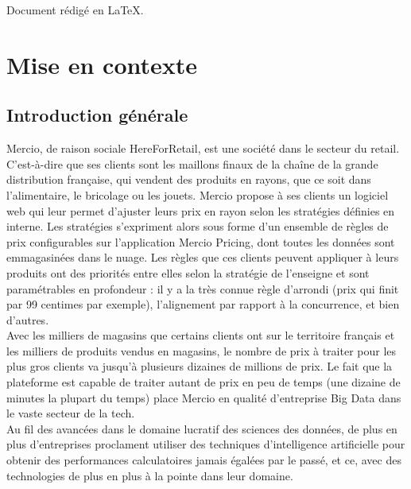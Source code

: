 \documentclass{rapportCS}
\begin{document}
Document rédigé en \LaTeX.
\newpage


\tabledematieres %




\section{Mise en contexte} 

\subsection{Introduction générale}
Mercio, de raison sociale HereForRetail, est une société dans le secteur du retail. 
C'est-à-dire que ses clients sont les maillons finaux de la chaîne de la grande distribution 
française, qui vendent des produits en rayons, que ce soit dans l'alimentaire, le bricolage 
ou les jouets. Mercio propose à ses clients un logiciel web qui leur permet d'ajuster leurs prix 
en rayon selon les stratégies définies en interne. Les stratégies s'expriment alors sous forme 
d'un ensemble de règles de prix configurables sur l'application Mercio Pricing, dont toutes les 
données sont emmagasinées dans le nuage. Les règles que ces clients peuvent appliquer à leurs 
produits ont des priorités entre elles selon la stratégie de l'enseigne et sont paramétrables en 
profondeur : il y a la très connue règle d'arrondi (prix qui finit par 99 centimes par exemple), 
l'alignement par rapport à la concurrence, et bien d'autres. \\
Avec les milliers de magasins que certains clients ont sur le territoire français et les milliers 
de produits vendus en magasins, le nombre de prix à traiter pour les plus gros clients va jusqu'à 
plusieurs dizaines de millions de prix. Le fait que la plateforme est capable de traiter autant de 
prix en peu de temps (une dizaine de minutes la plupart du temps) place Mercio en qualité 
d'entreprise Big Data dans le vaste secteur de la tech.\\
Au fil des avancées dans le domaine lucratif des sciences des données, de plus en plus 
d'entreprises proclament utiliser des techniques d'intelligence artificielle pour obtenir des 
performances calculatoires jamais égalées par le passé, et ce, avec des technologies de plus en plus
à la pointe dans leur domaine. 
\end{document}
